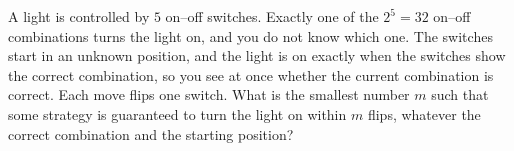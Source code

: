 A light is controlled by $5$ on--off switches. Exactly one of the $2^5=32$ on--off combinations turns the light on, and you do not know which one. The switches start in an unknown position, and the light is on exactly when the switches show the correct combination, so you see at once whether the current combination is correct. Each move flips one switch. What is the smallest number $m$ such that some strategy is guaranteed to turn the light on within $m$ flips, whatever the correct combination and the starting position?
